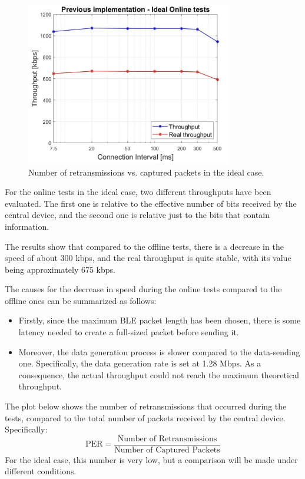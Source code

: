 \documentclass{Configuration_Files/PoliMi3i_thesis}
\begin{document}
\begin{figure}[H]
    \centering
    \includegraphics[width=0.8\textwidth]{Results Manuel/figure2}
    \caption{Number of retransmissions vs. captured packets in the ideal case.}
    \label{fig:figure1}
\end{figure}

For the online tests in the ideal case, two different throughputs have been evaluated. The first one is relative to the effective number of bits received by the central device, and the second one is relative just to the bits that contain information.

The results show that compared to the offline tests, there is a decrease in the speed of about 300 kbps, and the real throughput is quite stable, with its value being approximately 675 kbps.

The causes for the decrease in speed during the online tests compared to the offline ones can be summarized as follows:
\begin{itemize}
    \item Firstly, since the maximum BLE packet length has been chosen, there is some latency needed to create a full-sized packet before sending it.
    \item Moreover, the data generation process is slower compared to the data-sending one. Specifically, the data generation rate is set at 1.28 Mbps. As a consequence, the actual throughput could not reach the maximum theoretical throughput.
\end{itemize}

The plot below shows the number of retransmissions that occurred during the tests, compared to the total number of packets received by the central device. Specifically:
\[
\text{PER} = \frac{\text{Number of Retransmissions}}{\text{Number of Captured Packets}}
\]
For the ideal case, this number is very low, but a comparison will be made under different conditions.
\end{document}
